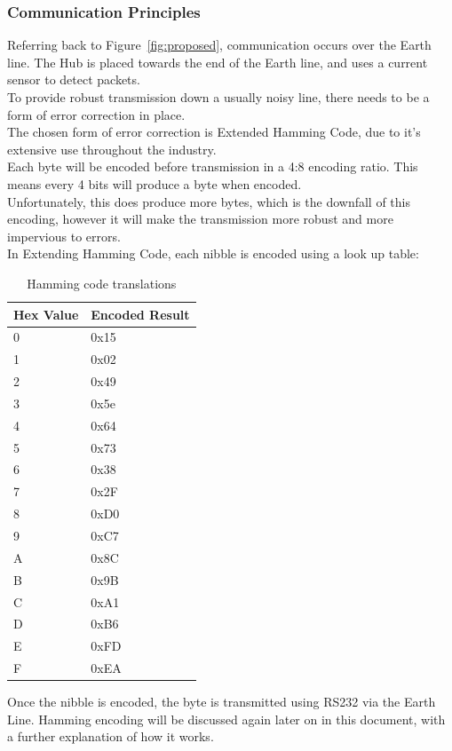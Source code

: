 \documentclass[draft,preprint,12pt,3p]{elsarticle}
\begin{document}
\subsubsection{Communication Principles}
Referring back to Figure~\ref{fig:proposed}, communication occurs over the Earth line. The Hub is placed towards the end of the Earth line, and uses a current sensor to detect packets.\\
To provide robust transmission down a usually noisy line, there needs to be a form of error correction in place.\\
The chosen form of error correction is Extended Hamming Code, due to it's extensive use throughout the industry.\\
Each byte will be encoded before transmission in a 4:8 encoding ratio. This means every 4 bits will produce a byte when encoded.\\
Unfortunately, this does produce more bytes, which is the downfall of this encoding, however it will make the transmission more robust and more impervious to errors.\\
In Extending Hamming Code, each nibble is encoded using a look up table:

\begin{table}[H]
\centering
\resizebox{4cm}{!} {%
    \centering
    \begin{tabular}{| l | l |}
    \hline
    Hex Value & Encoded Result  \\ \hline
    0 & 0x15 \\ \hline
    1 & 0x02 \\ \hline
    2 & 0x49 \\ \hline
    3 & 0x5e \\ \hline
    4 & 0x64 \\ \hline
    5 & 0x73 \\ \hline
    6 & 0x38 \\ \hline
    7 & 0x2F \\ \hline
    8 & 0xD0 \\ \hline
    9 & 0xC7 \\ \hline
    A & 0x8C \\ \hline
    B & 0x9B \\ \hline
    C & 0xA1 \\ \hline
    D & 0xB6 \\ \hline
    E & 0xFD \\ \hline
    F & 0xEA \\ \hline
    \end{tabular}
}
\caption{Hamming code translations}
\end{table}
Once the nibble is encoded, the byte is transmitted using RS232 via the Earth Line. Hamming encoding will be discussed again later on in this document, with a further explanation of how it works.
\end{document}
